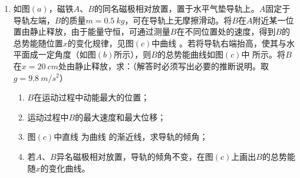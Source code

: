 \begin{enumerate}[leftmargin=0em]
{\begin{enumerate}
\end{enumerate}


}


\newpage
\item 
{}
如图$ (a) $，磁铁$ A $、$ B $的同名磁极相对放置，置于水平气垫导轨上。$ A $固定于导轨左端，$ B $的质量$ m=0.5 \ kg $，可在导轨上无摩擦滑动。将$ B $在$ A $附近某一位置由静止释放，由于能量守恒，可通过测量$ B $在不同位置处的速度，得到$ B $的总势能随位置$ x $的变化规律，见图$ (c) $中曲线  。若将导轨右端抬高，使其与水平面成一定角度（如图$ (b) $所示），则$ B $的总势能曲线如图$ (c) $中  所示。将$ B $在$ x=20 \ cm $处由静止释放，求：（解答时必须写出必要的推断说明。取$ g=9.8 \ m/s^{2} $）
\begin{enumerate}
\renewcommand{\labelenumi}{\arabic{enumi}.}
\item
$ B $在运动过程中动能最大的位置；
\item 
运动过程中$ B $的最大速度和最大位移；
\item 
图$ (c) $中直线  为曲线  的渐近线，求导轨的倾角；
\item 
若$ A $、$ B $异名磁极相对放置，导轨的倾角不变，在图$ (c) $上画出$ B $的总势能随$ x $的变化曲线。



\end{enumerate}
\begin{figure}[h!]
\centering

\end{figure}



\end{enumerate}
